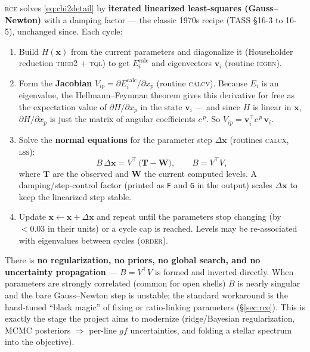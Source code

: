 \documentclass[11pt]{article}
\newcommand{\prog}[1]{\textsc{#1}}
\begin{document}
\prog{rce} solves \eqref{eq:chi2detail} by \textbf{iterated linearized
least-squares (Gauss--Newton)} with a damping factor --- the classic 1970s
recipe (TASS \S16-3 to 16-5), unchanged since. Each cycle:
\begin{enumerate}[nosep]
\item Build $H(\mathbf{x})$ from the current parameters and diagonalize it
(Householder reduction \textsc{tred2} + \textsc{tql}) to get
$E_i^{\mathrm{calc}}$ and eigenvectors $\mathbf{v}_i$ (routine \textsc{eigen}).
\item Form the \textbf{Jacobian} $V_{ip}=\partial E_i^{\mathrm{calc}}/\partial x_p$
(routine \textsc{calcv}). Because $E_i$ is an eigenvalue, the
Hellmann--Feynman theorem gives this derivative for free as the expectation value
of $\partial H/\partial x_p$ in the state $\mathbf{v}_i$ --- and since $H$ is
linear in $\mathbf{x}$, $\partial H/\partial x_p$ is just the matrix of angular
coefficients $c^{\,p}$. So $V_{ip} = \mathbf{v}_i^{\!\top} c^{\,p}\, \mathbf{v}_i$.
\item Solve the \textbf{normal equations} for the parameter step
$\Delta\mathbf{x}$ (routines \textsc{calcx}, \textsc{lss}):
\begin{equation}
  B\,\Delta\mathbf{x} = V^{\!\top}\,\big(\mathbf{T}-\mathbf{W}\big),
  \qquad B = V^{\!\top}V,
  \label{eq:normal}
\end{equation}
where $\mathbf{T}$ are the observed and $\mathbf{W}$ the current computed levels.
A damping/step-control factor (printed as \texttt{F} and \texttt{G} in the
output) scales $\Delta\mathbf{x}$ to keep the linearized step stable.
\item Update $\mathbf{x}\!\leftarrow\!\mathbf{x}+\Delta\mathbf{x}$ and repeat
until the parameters stop changing (by $<0.03$ in their units) or a cycle cap is
reached. Levels may be re-associated with eigenvalues between cycles
(\textsc{order}).
\end{enumerate}
There is \textbf{no regularization, no priors, no global search, and no
uncertainty propagation} --- $B=V^{\!\top}V$ is formed and inverted directly. When
parameters are strongly correlated (common for open shells) $B$ is nearly
singular and the bare Gauss--Newton step is unstable; the standard workaround is
the hand-tuned ``black magic'' of fixing or ratio-linking parameters
(\S\ref{sec:rce}). This is exactly the stage the project aims to modernize
(ridge/Bayesian regularization, MCMC posteriors $\Rightarrow$ per-line $gf$
uncertainties, and folding a stellar spectrum into the objective).
\end{document}

